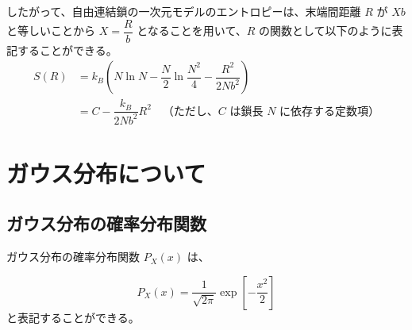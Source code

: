 \documentclass[uplatex,dvipdfmx,a4paper,11pt, titlepage]{jsarticle}
\begin{document}
\begin{appendix}
したがって、自由連結鎖の一次元モデルのエントロピーは、末端間距離 $R$ が $Xb$ と等しいことから $X = \dfrac{R}{b}$ となることを用いて、$R$ の関数として以下のように表記することができる。
\begin{align*}
S(R)
	&= k_B \left( N\ln N - \dfrac{N}{2} \ln \dfrac{N^2}{4} - \dfrac{R^2}{2Nb^2} \right) \\
	&= C -\dfrac{ k_B}{2Nb^2}R^2 \quad \text{（ただし、$C$ は鎖長 $N$ に依存する定数項）}
\end{align*}

%
%

\newpage
\section{ガウス分布について}
\label{sec:gauss}

\subsection{ガウス分布の確率分布関数}

ガウス分布の確率分布関数 $P_X(x)$ は、

\begin{equation*}
P_X(x) = \frac{1}{\sqrt{2 \pi}} \exp \left[- \frac{x^2}{2} \right]
\end{equation*}
と表記することができる。


\end{appendix}
\end{document}
